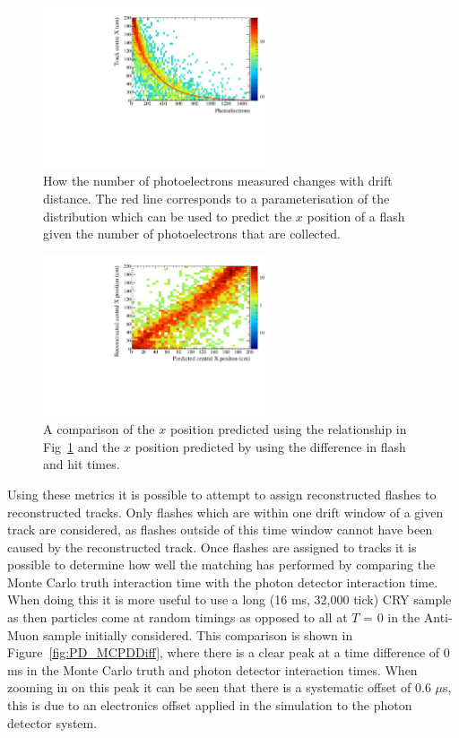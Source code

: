 \begin{figure}[h!]
  \centering
  \includegraphics[width=0.6\textwidth]{NumPE_Distance}
  \caption[How the number of photoelectrons measured changes with drift distance]
          {How the number of photoelectrons measured changes with drift distance. The red line corresponds to a parameterisation of the distribution which can be used to predict the $x$ position of a flash given the number of photoelectrons that are collected.}
  \label{fig:PD_PExPlot}
\end{figure}

\begin{figure}[h!]
  \centering
  \includegraphics[width=0.6\textwidth]{DiffFlashPredReco}
  \caption[The predited $x$ positions of flashes using the relationship between photoelectron and drift distance]
          {A comparison of the $x$ position predicted using the relationship in Fig~\ref{fig:PD_PExPlot} and the $x$ position predicted by using the difference in flash and hit times.}
  \label{fig:PD_PEDiffX}
\end{figure}

Using these metrics it is possible to attempt to assign reconstructed flashes to reconstructed tracks. Only flashes which are within one drift window of a given track are considered, as flashes outside of this time window cannot have been caused by the reconstructed track. Once flashes are assigned to tracks it is possible to determine how well the matching has performed by comparing the Monte Carlo truth interaction time with the photon detector interaction time. When doing this it is more useful to use a long (16 ms, 32,000 tick) CRY sample as then particles come at random timings as opposed to all at $T$ = 0 in the Anti-Muon sample initially considered. This comparison is shown in Figure~\ref{fig:PD_MCPDDiff}, where there is a clear peak at a time difference of 0 ms in the Monte Carlo truth and photon detector interaction times. When zooming in on this peak it can be seen that there is a systematic offset of 0.6 $\mu$s, this is due to an electronics offset applied in the simulation to the photon detector system. \\

